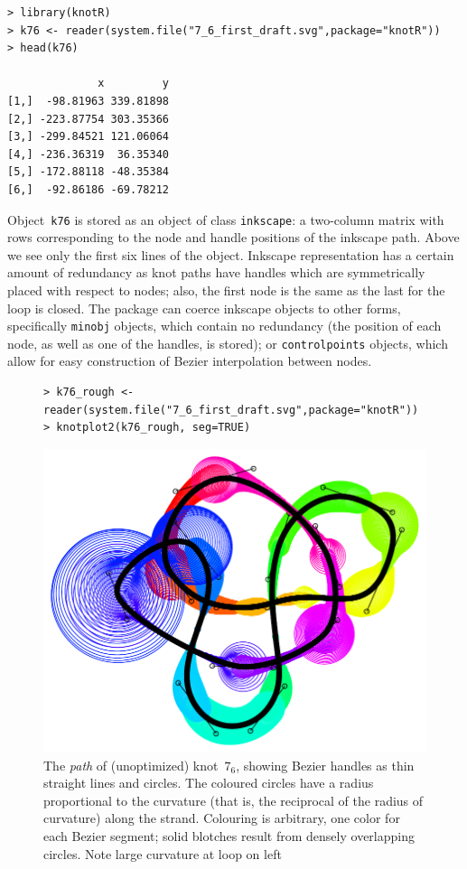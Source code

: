 \documentclass{birkjour}
\theoremstyle{definition}
\theoremstyle{remark}
\numberwithin{equation}{section}
\begin{document}
\begin{verbatim}
> library(knotR)
> k76 <- reader(system.file("7_6_first_draft.svg",package="knotR"))
> head(k76)

              x         y
[1,]  -98.81963 339.81898
[2,] -223.87754 303.35366
[3,] -299.84521 121.06064
[4,] -236.36319  36.35340
[5,] -172.88118 -48.35384
[6,]  -92.86186 -69.78212
\end{verbatim}

Object~{\tt k76} is stored as an object of class {\tt inkscape}: a
two-column matrix with rows corresponding to the node and handle
positions of the inkscape path.  Above we see only the first six lines
of the object.  Inkscape representation has a certain amount of
redundancy as knot paths have handles which are symmetrically placed
with respect to nodes; also, the first node is the same as the last
for the loop is closed.  The package can coerce inkscape objects to
other forms, specifically {\tt minobj} objects, which contain no
redundancy (the position of each node, as well as one of the handles,
is stored); or {\tt controlpoints} objects, which allow for easy
construction of Bezier interpolation between nodes.

\begin{figure}[htbp]
  \begin{center}
\begin{verbatim}
> k76_rough <- reader(system.file("7_6_first_draft.svg",package="knotR"))
> knotplot2(k76_rough, seg=TRUE)
\end{verbatim}

\begin{centering}
\includegraphics[scale = 0.9]{knot-7_6_rough}
\caption{The \emph{path} of (unoptimized) \label{7_6_rough}
  knot~$7_6$, showing Bezier handles as thin straight lines and
  circles.  The coloured circles have a radius proportional to the
  curvature (that is, the reciprocal of the radius of curvature) along
  the strand.  Colouring is arbitrary, one color for each Bezier
  segment; solid blotches result from densely overlapping circles.
  Note large curvature at loop on left}
  \end{centering}
  \end{center}
\end{figure}
\end{document}
